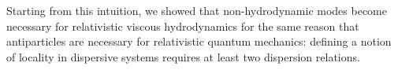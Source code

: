 \documentclass[prl, amsfonts, amssymb, amsmath, nofootinbib,reprint, showkeys, twoside,notitlepage]{revtex4-2}
\theoremstyle{definition}
\theoremstyle{theorem}
\theoremstyle{corollary}
\begin{document}
Starting from this intuition, we showed that non-hydrodynamic modes become necessary for relativistic viscous hydrodynamics for the same reason that antiparticles are necessary for relativistic quantum mechanics: defining a notion of locality in dispersive systems requires at least two dispersion relations.









\end{document}
